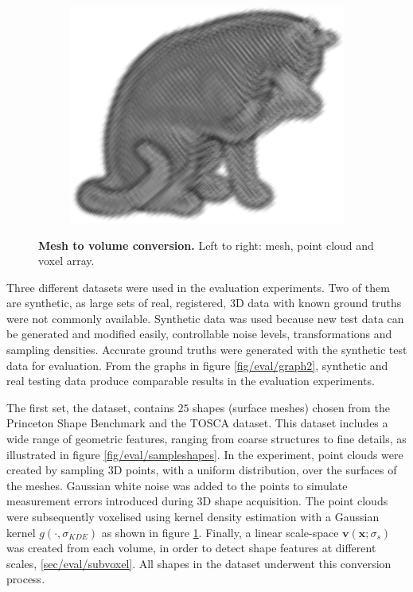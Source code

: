 \begin{figure}[ht]
	\begin{subfigure}[t]{0.31\linewidth} \centering 
		\includegraphics[height=0.85\linewidth]{./fig/eval/cat_volume.png}
	\end{subfigure}
	\caption{\textbf{Mesh to volume conversion.} Left to right: mesh, point cloud and voxel array.} 
	\label{fig/eval/vol_conversion}
\end{figure}

Three different datasets were used in the evaluation experiments. Two of them are synthetic, as large sets of real, registered, 3D data with known ground truths were not commonly available. Synthetic data was used because new test data can be generated and modified easily, \eg controllable noise levels, transformations and sampling densities. Accurate ground truths were generated with the synthetic test data for evaluation.  
From the graphs in figure \ref{fig/eval/graph2}, synthetic and real testing data produce comparable results in the evaluation experiments. 

The first set, the \meshset dataset, contains $25$ shapes (surface meshes) chosen from the Princeton Shape Benchmark \cite{Shilane2004} and the TOSCA \cite{Bronstein2008} dataset. 
This dataset includes a wide range of geometric features, ranging from coarse structures to fine details, as illustrated in figure \ref{fig/eval/sampleshapes}. In the experiment, point clouds were created by sampling 3D points, with a uniform distribution, over the surfaces of the meshes. Gaussian white noise was added to the points to simulate measurement errors introduced during 3D shape acquisition. 
The point clouds were subsequently voxelised using kernel density estimation with a Gaussian kernel $g(\cdot,\sigma_{KDE})$ as shown in figure \ref{fig/eval/vol_conversion}.
Finally, a linear scale-space $\mathbf{v}(\mathbf{x};\sigma_s)$ was created from each volume, in order to detect shape features at different scales, \cf \ref{sec/eval/subvoxel}. All shapes in the dataset underwent this conversion process. 

